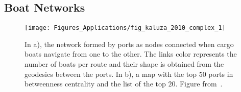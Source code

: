 \subsection{Boat Networks}

\begin{figure}
\centering
\texttt{[image: Figures\_Applications/fig\_kaluza\_2010\_complex\_1]}
\caption{In a), the network formed by ports as nodes connected when cargo boats navigate from one to the other. The links color represents the number of boats per route and their shape is obtained from the geodesics between the ports. In b), a map with the top $50$ ports in betweenness centrality and the list of the top $20$. Figure from~\cite{kaluza_2010_complex_2}. \label{fig:kaluza_2010_complex_1}}
\end{figure}



